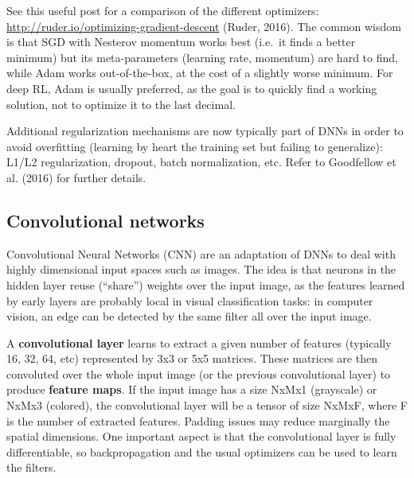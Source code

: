 \documentclass[
  letterpaper,
  DIV=11,
  numbers=noendperiod]{scrreprt}
\begin{document}
See this useful post for a comparison of the different optimizers:
\url{http://ruder.io/optimizing-gradient-descent} (Ruder, 2016). The
common wisdom is that SGD with Nesterov momentum works best (i.e.~it
finds a better minimum) but its meta-parameters (learning rate,
momentum) are hard to find, while Adam works out-of-the-box, at the cost
of a slightly worse minimum. For deep RL, Adam is usually preferred, as
the goal is to quickly find a working solution, not to optimize it to
the last decimal.

Additional regularization mechanisms are now typically part of DNNs in
order to avoid overfitting (learning by heart the training set but
failing to generalize): L1/L2 regularization, dropout, batch
normalization, etc. Refer to Goodfellow et al. (2016) for further
details.

\hypertarget{convolutional-networks}{%
\subsection{Convolutional networks}\label{convolutional-networks}}

Convolutional Neural Networks (CNN) are an adaptation of DNNs to deal
with highly dimensional input spaces such as images. The idea is that
neurons in the hidden layer reuse (``share'') weights over the input
image, as the features learned by early layers are probably local in
visual classification tasks: in computer vision, an edge can be detected
by the same filter all over the input image.

A \textbf{convolutional layer} learns to extract a given number of
features (typically 16, 32, 64, etc) represented by 3x3 or 5x5 matrices.
These matrices are then convoluted over the whole input image (or the
previous convolutional layer) to produce \textbf{feature maps}. If the
input image has a size NxMx1 (grayscale) or NxMx3 (colored), the
convolutional layer will be a tensor of size NxMxF, where F is the
number of extracted features. Padding issues may reduce marginally the
spatial dimensions. One important aspect is that the convolutional layer
is fully differentiable, so backpropagation and the usual optimizers can
be used to learn the filters.
\end{document}
